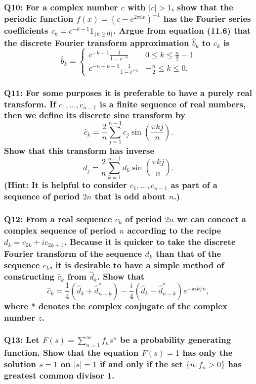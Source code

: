 \documentclass[8pt]{article}
\begin{document}
\subsubsection*{Q10:
For a complex number \(c\) with \(|c| > 1\), show that the periodic function \(f(x) = (c - e^{2\pi ix})^{-1}\) has the Fourier series coefficients \(c_k = c^{-k-1}1_{\{k \geq 0\}}\). Argue from equation (11.6) that the discrete Fourier transform approximation \(\hat{b}_k\) to \(c_k\) is
\[
\hat{b}_k = \begin{cases}
c^{-k-1} \frac{1}{1 - c^{-n}} & 0 \leq k \leq \frac{n}{2} - 1 \\
c^{-n-k-1} \frac{1}{1 - c^{-n}} & -\frac{n}{2} \leq k \leq 0.
\end{cases}
\]}

\subsubsection*{Q11:
For some purposes it is preferable to have a purely real transform. If \(c_1, \ldots, c_{n-1}\) is a finite sequence of real numbers, then we define its discrete sine transform by
\[
\hat{c}_k = \frac{2}{n} \sum_{j=1}^{n-1} c_j \sin \left( \frac{\pi kj}{n} \right).
\]
Show that this transform has inverse
\[
\dot{d}_j = \frac{2}{n} \sum_{k=1}^{n-1} d_k \sin \left( \frac{\pi kj}{n} \right).
\]
(Hint: It is helpful to consider \(c_1, \ldots, c_{n-1}\) as part of a sequence of period \(2n\) that is odd about \(n\).)}

\subsubsection*{Q12:
From a real sequence \(c_k\) of period \(2n\) we can concoct a complex sequence of period \(n\) according to the recipe \(d_k = c_{2k} + i c_{2k+1}\). Because it is quicker to take the discrete Fourier transform of the sequence \(d_k\) than that of the sequence \(c_k\), it is desirable to have a simple method of constructing \(\hat{c}_k\) from \(\hat{d}_k\). Show that
\[
\hat{c}_k = \frac{1}{4} \left( \hat{d}_k + \hat{d}^*_{n-k} \right) - \frac{i}{4} \left( \hat{d}_k - \hat{d}^*_{n-k} \right) e^{-\pi i k / n},
\]
where \(*\) denotes the complex conjugate of the complex number \(z\).}

\subsubsection*{Q13:
Let \(F(s) = \sum_{n=1}^{\infty} f_n s^n\) be a probability generating function. Show that the equation \(F(s) = 1\) has only the solution \(s = 1\) on \(|s| = 1\) if and only if the set \(\{ n : f_n > 0 \}\) has greatest common divisor 1.}
\end{document}
